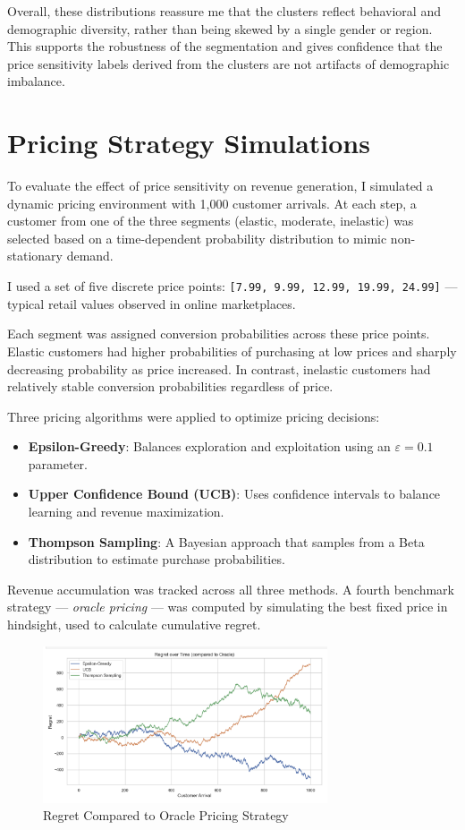 \documentclass[12pt]{article}
\begin{document}
Overall, these distributions reassure me that the clusters reflect behavioral and demographic diversity, rather than being skewed by a single gender or region. This supports the robustness of the segmentation and gives confidence that the price sensitivity labels derived from the clusters are not artifacts of demographic imbalance.



\section{Pricing Strategy Simulations}

To evaluate the effect of price sensitivity on revenue generation, I simulated a dynamic pricing environment with 1,000 customer arrivals. At each step, a customer from one of the three segments (elastic, moderate, inelastic) was selected based on a time-dependent probability distribution to mimic non-stationary demand.

I used a set of five discrete price points: \texttt{[7.99, 9.99, 12.99, 19.99, 24.99]} — typical retail values observed in online marketplaces.

Each segment was assigned conversion probabilities across these price points. Elastic customers had higher probabilities of purchasing at low prices and sharply decreasing probability as price increased. In contrast, inelastic customers had relatively stable conversion probabilities regardless of price.

Three pricing algorithms were applied to optimize pricing decisions:
\begin{itemize}
  \item \textbf{Epsilon-Greedy}: Balances exploration and exploitation using an \( \varepsilon = 0.1 \) parameter.
  \item \textbf{Upper Confidence Bound (UCB)}: Uses confidence intervals to balance learning and revenue maximization.
  \item \textbf{Thompson Sampling}: A Bayesian approach that samples from a Beta distribution to estimate purchase probabilities.
\end{itemize}


Revenue accumulation was tracked across all three methods. A fourth benchmark strategy — \textit{oracle pricing} — was computed by simulating the best fixed price in hindsight, used to calculate cumulative regret.

\begin{figure}[h!]
  \centering
  \includegraphics[width=0.75\textwidth]{figures/regret overtime.png}
  \caption{Regret Compared to Oracle Pricing Strategy}
  \label{fig:regret}
\end{figure}
\end{document}

